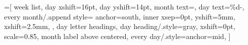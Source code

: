 \newcommand\DeskCoverPage{%
  \IfFileExists{./desk-cover-\@wall@calendarLanguage.tex}%
  {}%
  {}
}%


\newcommand\plannerYearFmt{\fontsize{26}{26}\selectfont\color{orangegold}}

\newlength\plannerNotesSep
\newlength\plannerTitleSep
\newlength\plannerTopSkip
\setlength{\plannerNotesSep}{3mm}
\setlength{\plannerTitleSep}{7mm}
\setlength{\plannerTopSkip}{0pt}

\newcommand\preYearPlannerPageHook{}

\newcommand\printPlannerTitle{\plannerYearFmt \CalendarYear\ / \CalendarAltYear}

\newcommand\tabcolgap{\hspace*{20pt}}

=[
  week list,
  day xshift=16pt,
  day yshift=14pt,
  month text={\plannerPortraitMonthFmt\@tr@monthNumName{\pgfcalendarcurrentmonth}},
  day text={\plannerPortraitDayFmt\%d-},
  every month/.append style={%
    anchor=south,
    inner xsep=0pt,
    yshift=5mm,
    xshift=2.5mm,
  },
  day letter headings,
  day heading/.style={gray, xshift=0pt, scale=0.85},
  month label above centered,
  every day/.style={anchor=mid},
]

\newcommand*\parseYearEventsAsThreeColsTable[1][]{%
\pgfkeys{/parseYearEvents, defaults, #1,
  year/.get=\@t@year,
  filter pred/.get=\@t@filterPred,
  events csv/.get=\@t@eventsCsv,
}%
\luadirect{
require("../template-helpers/helpers.lua")
yearEventsAsThreeColsTable(
  tonumber(\@t@year),
  \@t@filterPred,
  \luastring{\@t@eventsCsv}
)}}

\renewcommand\plannerEvents{%
\hspace*{-\@wall@leftMargin}%
\begin{minipage}{\calPaperWidth}%
\centering
\fontsize{9}{12}\selectfont%
\parseYearEventsAsThreeColsTable[filter pred = hasNote]%
\par%
\end{minipage}}

\newcommand\YearPlannerPortraitPage{%
\newpage
\ifvarnishmask
\mbox{}
\else
\preYearPlannerPageHook

\vspace*{\plannerTopSkip}%

{\centering

{\printPlannerTitle}

\vspace*{\plannerTitleSep}

\YearPlannerPortrait

\vspace*{\plannerNotesSep}

\plannerEvents

}

\fi
}

